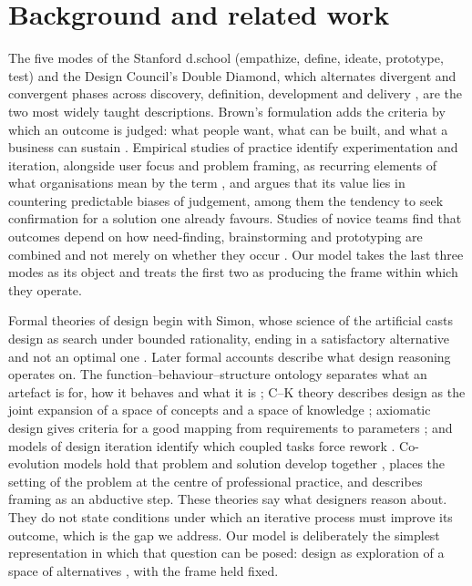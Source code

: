 \documentclass[10pt,twocolumn]{article}
\theoremstyle{definition}
\begin{document}
\section{Background and related work}
\label{sec:related}

The five modes of the Stanford d.school (empathize, define, ideate, prototype, test) \citep{dschool2010} and the Design Council's Double Diamond, which alternates divergent and convergent phases across discovery, definition, development and delivery \citep{designcouncil2007}, are the two most widely taught descriptions. Brown's formulation adds the criteria by which an outcome is judged: what people want, what can be built, and what a business can sustain \citep{brown2008, brown2009}. Empirical studies of practice identify experimentation and iteration, alongside user focus and problem framing, as recurring elements of what organisations mean by the term \citep{carlgren2016, micheli2019}, and \citet{liedtka2015} argues that its value lies in countering predictable biases of judgement, among them the tendency to seek confirmation for a solution one already favours. Studies of novice teams find that outcomes depend on how need-finding, brainstorming and prototyping are combined and not merely on whether they occur \citep{seidel2013}. Our model takes the last three modes as its object and treats the first two as producing the frame within which they operate.

Formal theories of design begin with Simon, whose science of the artificial \citep{simon1996} casts design as search under bounded rationality, ending in a satisfactory alternative and not an optimal one \citep{simon1956}. Later formal accounts describe what design reasoning operates on. The function--behaviour--structure ontology separates what an artefact is for, how it behaves and what it is \citep{gero2004}; C--K theory describes design as the joint expansion of a space of concepts and a space of knowledge \citep{hatchuel2009}; axiomatic design gives criteria for a good mapping from requirements to parameters \citep{suh1990}; and models of design iteration identify which coupled tasks force rework \citep{smitheppinger1997}. Co-evolution models hold that problem and solution develop together \citep{maherpoon1996, dorstcross2001}, \citet{schon1983} places the setting of the problem at the centre of professional practice, and \citet{dorst2011} describes framing as an abductive step. These theories say what designers reason about. They do not state conditions under which an iterative process must improve its outcome, which is the gap we address. Our model is deliberately the simplest representation in which that question can be posed: design as exploration of a space of alternatives \citep{woodbury2006}, with the frame held fixed.
\end{document}
